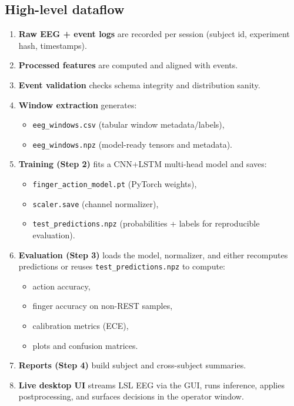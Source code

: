 \documentclass[11pt]{article}
\begin{document}
\subsection{High-level dataflow}
\begin{enumerate}[leftmargin=*]
\item \textbf{Raw EEG + event logs} are recorded per session (subject id, experiment hash, timestamps).
\item \textbf{Processed features} are computed and aligned with events.
\item \textbf{Event validation} checks schema integrity and distribution sanity.
\item \textbf{Window extraction} generates:
  \begin{itemize}
  \item \texttt{eeg\_windows.csv} (tabular window metadata/labels),
  \item \texttt{eeg\_windows.npz} (model-ready tensors and metadata).
  \end{itemize}
\item \textbf{Training (Step 2)} fits a CNN+LSTM multi-head model and saves:
  \begin{itemize}
  \item \texttt{finger\_action\_model.pt} (PyTorch weights),
  \item \texttt{scaler.save} (channel normalizer),
  \item \texttt{test\_predictions.npz} (probabilities + labels for reproducible evaluation).
  \end{itemize}
\item \textbf{Evaluation (Step 3)} loads the model, normalizer, and either recomputes predictions or reuses \texttt{test\_predictions.npz} to compute:
  \begin{itemize}
  \item action accuracy,
  \item finger accuracy on non-REST samples,
  \item calibration metrics (ECE),
  \item plots and confusion matrices.
  \end{itemize}
\item \textbf{Reports (Step 4)} build subject and cross-subject summaries.
\item \textbf{Live desktop UI} streams LSL EEG via the GUI, runs inference, applies postprocessing, and surfaces decisions in the operator window.
\end{enumerate}
\end{document}
